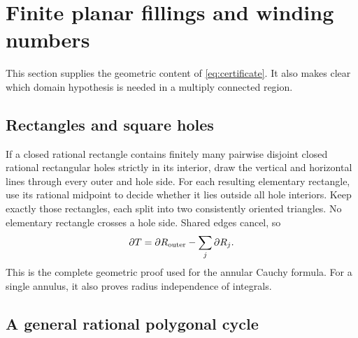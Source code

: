 \documentclass[11pt]{article}
\theoremstyle{definition}
\newcommand{\bd}{\partial}
\begin{document}
\section{Finite planar fillings and winding numbers}\label{sec:geometry}

This section supplies the geometric content of
\eqref{eq:certificate}. It also makes clear which domain hypothesis is
needed in a multiply connected region.

\subsection{Rectangles and square holes}

If a closed rational rectangle contains finitely many pairwise disjoint
closed rational rectangular holes strictly in its interior, draw the
vertical and horizontal lines through every outer and hole side.
For each resulting elementary rectangle, use its rational midpoint to
decide whether it lies outside all hole interiors. Keep exactly those
rectangles, each split into two consistently oriented triangles.
No elementary rectangle crosses a hole side. Shared edges cancel, so
\begin{equation}\label{eq:gridboundary}
 \bd T=\bd R_{\rm outer}-\sum_j\bd R_j.
\end{equation}
This is the complete geometric proof used for the annular Cauchy formula.
For a single annulus, it also proves radius independence of integrals.

\subsection{A general rational polygonal cycle}
\end{document}
